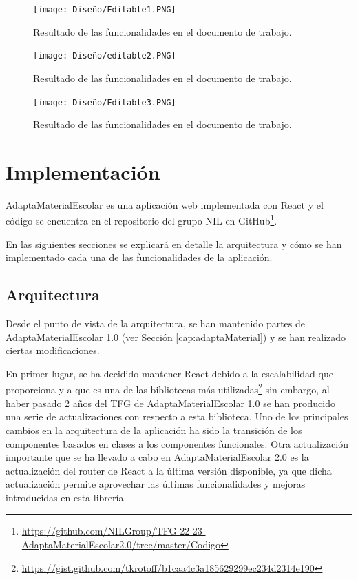 \begin{figure}[ht!]
  \centering
  \texttt{[image: Diseño/Editable1.PNG]}
  \caption{Resultado de las funcionalidades en el documento de trabajo.}
  \label{editable1}
\end{figure}

\begin{figure}[ht!]
  \centering
  \texttt{[image: Diseño/editable2.PNG]}
  \caption{Resultado de las funcionalidades en el documento de trabajo.}
  \label{editable2}
\end{figure}

\begin{figure}[ht!]
  \centering
  \texttt{[image: Diseño/Editable3.PNG]}
  \caption{Resultado de las funcionalidades en el documento de trabajo.}
  \label{editable3}
\end{figure}

\section{Implementación}
\label{sec:implmentaction}
AdaptaMaterialEscolar es una aplicación web implementada con React y el código se encuentra en el repositorio del grupo NIL en GitHub\footnote{\url{https://github.com/NILGroup/TFG-22-23-AdaptaMaterialEscolar2.0/tree/master/Codigo}}.

En las siguientes secciones se explicará en detalle la arquitectura y cómo se han implementado cada una de las funcionalidades de la aplicación.
\subsection{Arquitectura}
\label{sub:Arquitectura}
Desde el punto de vista de la arquitectura, se han mantenido partes de AdaptaMaterialEscolar 1.0 (ver Sección \ref{cap:adaptaMaterial}) y se han realizado ciertas modificaciones.

En primer lugar, se ha decidido mantener React debido a la escalabilidad que proporciona y a que es una de las bibliotecas más utilizadas\footnote{\url{https://gist.github.com/tkrotoff/b1caa4c3a185629299ec234d2314e190}} sin embargo, al haber pasado 2 años del TFG de AdaptaMaterialEscolar 1.0 se han producido una serie de actualizaciones con respecto a esta biblioteca. Uno de los principales cambios en la arquitectura de la aplicación ha sido la transición de los componentes basados en clases a los componentes funcionales. Otra actualización importante que se ha llevado a cabo en AdaptaMaterialEscolar 2.0 es la actualización del router de React a la última versión disponible, ya que dicha actualización  permite aprovechar las últimas funcionalidades y mejoras introducidas en esta librería.

